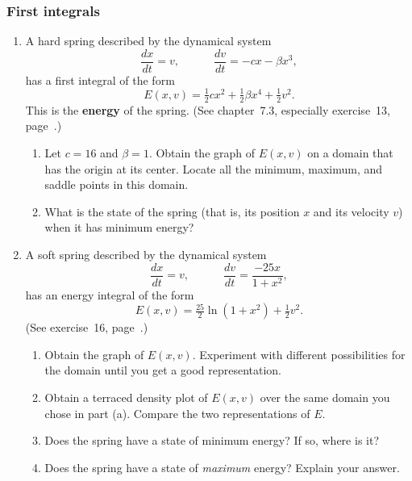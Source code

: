 \subsubsection{First integrals}
\label{subsubsec:first-integrals}



\begin{enumerate}
\item A hard spring described by
the dynamical system
\[
\dfrac{dx}{dt} = v, \qquad \quad \dfrac{dv}{dt} = - cx - \beta x^3,
\]
has a first integral of the form
\[
E(x, v) = \tfrac {1}{2}c x^2 + \tfrac {1}{2} \beta x^4 + \tfrac{1}{2}v^2.
\]
This is the {\bf energy} of the spring.  (See
chapter~7.3, especially exercise~13, page~\pageref{spring energy}.)


  \begin{enumerate}
  \item Let $c = 16$ and $\beta = 1$.  Obtain the graph of $E(x, v)$ on a
domain that has the origin at its center.  Locate all the minimum,
maximum, and saddle points in this domain.

  \item What is the state of the spring (that is, its position $x$ and
its velocity $v$) when it has minimum energy?


\end{enumerate}
\item A soft spring described by
the dynamical system
\[
\dfrac{dx}{dt} = v, \qquad \quad \dfrac{dv}{dt} = \dfrac{-25x}{1 + x^2},
\]
has an energy integral of the form
\[
E(x, v) = \tfrac{25}{2} \ln(1 + x^2) + \tfrac{1}{2}v^2.
\]
(See exercise~16, page~\pageref{ln first int}.)  


  \begin{enumerate}
  \item Obtain the graph of $E(x, v)$.  Experiment with different
possibilities for the domain until you get a good representation.

  \item Obtain a terraced density plot of $E(x, v)$ over the same domain
you chose in part (a).  Compare the two representations of $E$.

  \item Does the spring have a state of minimum energy?  If so, where is
it?

  \item Does the spring have a state of {\em maximum\/} energy?  Explain
your answer.



\end{enumerate}
\end{enumerate}
